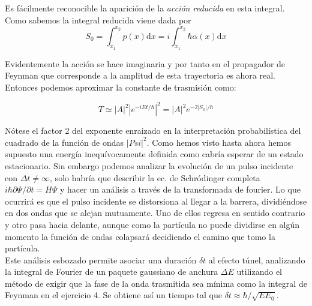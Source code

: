 \documentclass[12pt]{article}
\newcommand{\D}{\mathrm{d}}
\begin{document}
Es fácilmente reconocible la aparición de la \textit{acción reducida} en esta integral. Como sabemos la integral reducida viene dada por $$S_0 = \int_{x_1}^{x_2} p(x) \D x = i \int_{x_1}^{x_2} \hbar \alpha (x) \D x$$ 

Evidentemente la acción se hace imaginaria y por tanto en el propagador de Feynman que corresponde a la amplitud de esta trayectoria es ahora real. Entonces podemos aproximar la constante de trasmisión como:

\begin{equation}
T \simeq |A|^2 \left| e^{-i E t / \hbar } \right|^2 = |A|^2 e^{-2 |S_0|/\hbar}
\end{equation} 

Nótese el factor 2 del exponente enraizado en la interpretación probabilística del cuadrado de la función de ondas $| Psi|^2$. Como hemos visto hasta ahora hemos supuesto una energía inequívocamente definida como cabría esperar de un estado estacionario. Sin embargo podemos analizar la evolución de un pulso incidente con $\Delta t \neq \infty$, solo habría que describir la ec. de Schródinger completa $i \hbar \partial \Psi / \partial t = H \Psi$ y hacer un análisis a través de la transformada de fourier. Lo que ocurrirá es que el pulso incidente se distorsiona al llegar a la barrera, dividiéndose en dos ondas que se alejan mutuamente. Uno de ellos regresa en sentido contrario y otro pasa hacia delante, aunque como la partícula no puede dividirse en algún momento la función de ondas colapsará decidiendo el camino que tomo la partícula. \\

Este análisis esbozado permite asociar una duración $\delta t$ al efecto túnel, analizando la integral de Fourier de un paquete gaussiano de anchura $\Delta E$ utilizando el método de exigir que la fase de la onda trasmitida sea mínima como la integral de Feynman en el ejercicio 4. Se obtiene así un tiempo tal que $\delta t \approx \hbar / \sqrt{E E_0}$. 
\end{document}
